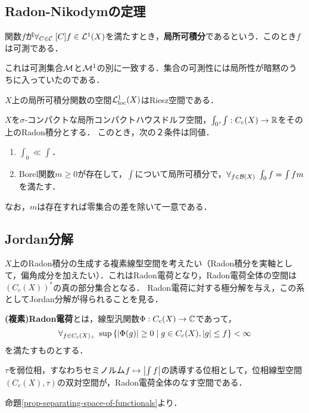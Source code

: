 \documentclass[uplatex,dvipdfmx]{jsreport}
\begin{document}
\subsection{Radon-Nikodymの定理}

\begin{definition}\label{def-locally-integrable-function}
    関数$f$が$\forall_{C\in\mathcal{C}}\;[C]f\in\mathcal{L}^1(X)$を満たすとき，\textbf{局所可積分}であるという．このとき$f$は可測である．
\end{definition}
\begin{remarks}
    これは可測集合$\mathcal{M}$と$\mathcal{M}^1$の別に一致する．集合の可測性には局所性が暗黙のうちに入っていたのである．
\end{remarks}

\begin{lemma}
    $X$上の局所可積分関数の空間$\mathcal{L}^1_{\mathrm{loc}}(X)$はRiesz空間である．
\end{lemma}

\begin{theorem}
    $X$を$\sigma$-コンパクトな局所コンパクトハウスドルフ空間，$\int_0,\int:C_c(X)\to\mathbb{R}$をその上のRadon積分とする．
    このとき，次の２条件は同値．
    \begin{enumerate}
        \item $\int_0\ll\int$．
        \item Borel関数$m\ge0$が存在して，$\int$について局所可積分で，$\forall_{f\in\mathcal{B}(X)}\;\int_0f=\int fm$を満たす．
    \end{enumerate}
    なお，$m$は存在すれば零集合の差を除いて一意である．
\end{theorem}

\subsection{Jordan分解}

\begin{tcolorbox}[colframe=ForestGreen, colback=ForestGreen!10!white,breakable,colbacktitle=ForestGreen!40!white,coltitle=black,fonttitle=\bfseries\sffamily,
title=]
    $X$上のRadon積分の生成する複素線型空間を考えたい（Radon積分を実軸として，偏角成分を加えたい）．これはRadon電荷となり，Radon電荷全体の空間は$(C_c(X))^*$の真の部分集合となる．
    Radon電荷に対する極分解を与え，この系としてJordan分解が得られることを見る．
\end{tcolorbox}

\begin{definition}
    \textbf{(複素)Radon電荷}とは，線型汎関数$\Phi:C_c(X)\to\mathbb{C}$であって，
    \[\forall_{f\in C_c(X)_+}\;\sup\left\{\lvert\Phi(g)\rvert\ge0\mid g\in C_c(X),\lvert g\rvert\le f\right\}<\infty\]
    を満たすものとする．
\end{definition}
\begin{lemma}[Radon電荷の抽象的特徴付け]
    $\tau$を弱位相，すなわちセミノルム$f\mapsto\left|\int f\right|$の誘導する位相として，位相線型空間$(C_c(X),\tau)$の双対空間が，Radon電荷全体のなす空間である．
\end{lemma}
\begin{Proof}
    命題\ref{prop-separating-space-of-functionals}より．
\end{Proof}
\end{document}

